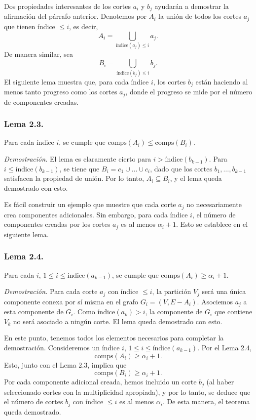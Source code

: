 \documentclass[a4paper, 12pt]{article}
\begin{document}
Dos propiedades interesantes de los cortes \( a_i \) y \( b_j \) ayudarán a demostrar la afirmación del párrafo anterior. Denotemos por \( A_i \) la unión de todos los cortes \( a_j \) que tienen índice \( \leq i \), es decir,
\[
A_i = \bigcup_{\text{índice}(a_j)\leq i} a_j.
\]
De manera similar, sea
\[
B_i = \bigcup_{\text{índice}(b_j)\leq i} b_j.
\]
El siguiente lema muestra que, para cada índice \( i \), los cortes \( b_j \) están haciendo al menos tanto progreso como los cortes \( a_j \), donde el progreso se mide por el número de componentes creadas.

\subsubsection*{Lema 2.3.} 
Para cada índice \( i \), se cumple que \( \text{comps}(A_i) \leq \text{comps}(B_i) \).

\textit{Demostración.} El lema es claramente cierto para \( i > \text{índice}(b_{k-1}) \). Para \( i \leq \text{índice}(b_{k-1}) \), se tiene que \( B_i = c_1 \cup \dots \cup c_i \), dado que los cortes \( b_1, \dots, b_{k-1} \) satisfacen la propiedad de unión. Por lo tanto, \( A_i \subseteq B_i \), y el lema queda demostrado con esto.

Es fácil construir un ejemplo que muestre que cada corte \( a_j \) no necesariamente crea componentes adicionales. Sin embargo, para cada índice \( i \), el número de componentes creadas por los cortes \( a_j \) es al menos \( \alpha_i + 1 \). Esto se establece en el siguiente lema.

\subsubsection*{Lema 2.4.} 
Para cada \( i \), \( 1 \leq i \leq \text{índice}(a_{k-1}) \), se cumple que \( \text{comps}(A_i) \geq \alpha_i + 1 \).

\textit{Demostración.} Para cada corte \( a_j \) con índice \( \leq i \), la partición \( V_j \) será una única componente conexa por sí misma en el grafo \( G_i = (V, E - A_i) \). Asociemos \( a_j \) a esta componente de \( G_i \). Como \( \text{índice}(a_k) > i \), la componente de \( G_i \) que contiene \( V_k \) no será asociado a ningún corte. El lema queda demostrado con esto.

En este punto, tenemos todos los elementos necesarios para completar la demostración. Consideremos un índice \( i \), \( 1 \leq i \leq \text{índice}(a_{k-1}) \). Por el Lema 2.4,
\[
\text{comps}(A_i) \geq \alpha_i + 1.
\]
Esto, junto con el Lema 2.3, implica que
\[
\text{comps}(B_i) \geq \alpha_i + 1.
\]
Por cada componente adicional creada, hemos incluido un corte \( b_j \)  
(al haber seleccionado cortes con la multiplicidad apropiada), y por lo tanto, se deduce que el número de cortes \( b_j \) con índice \( \leq i \) es al menos \( \alpha_i \). De esta manera, el teorema queda demostrado.
\end{document}
